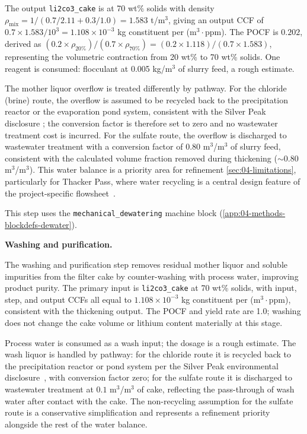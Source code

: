 The output \texttt{li2co3\_cake} is at 70 wt\% solids with density $\rho_\text{mix} = 1/(0.7/2.11 + 0.3/1.0) = 1.583$ t/m$^3$, giving an output CCF of $0.7 \times 1.583 / 10^3 = 1.108 \times 10^{-3}$ kg constituent per (m$^3 \cdot$ppm). The POCF is $0.202$, derived as $(0.2 \times \rho_{20\%}) / (0.7 \times \rho_{70\%}) = (0.2 \times 1.118) / (0.7 \times 1.583)$, representing the volumetric contraction from 20 wt\% to 70 wt\% solids. One reagent is consumed: flocculant at 0.005 kg/m$^3$ of slurry feed, a rough estimate.
 
The mother liquor overflow is treated differently by pathway. For the chloride (brine) route, the overflow is assumed to be recycled back to the precipitation reactor or the evaporation pond system, consistent with the Silver Peak  disclosure \cite{srkconsultingSECTechnicalReport2023a}; the conversion factor is therefore set to zero and no wastewater treatment cost is incurred. For the sulfate route, the overflow is discharged to wastewater treatment with a conversion factor of $0.80$ m$^3$/m$^3$ of slurry feed, consistent with the calculated volume fraction removed during thickening ($\sim$0.80 m$^3$/m$^3$). This water balance is a priority area for refinement \ref{sec:04-limitations}, particularly for Thacker Pass, where water recycling is a central design feature of the project-specific flowsheet~\cite{sgscanadaincSK1300Technical2024}.

This step uses the \texttt{mechanical\_dewatering} machine block (\ref{app:04-methods-blockdefs-dewater}).

\medskip
\noindent\textbf{Washing and purification.}\quad

The washing and purification step removes residual mother liquor and soluble impurities from the  filter cake by counter-washing with process water, improving product purity. The primary input is \texttt{li2co3\_cake} at 70 wt\% solids, with input, step, and output CCFs all equal to $1.108 \times 10^{-3}$ kg constituent per (m$^3 \cdot$ppm), consistent with the thickening output. The POCF and yield rate are 1.0; washing does not change the cake volume or lithium content materially at this stage.
 
Process water is consumed as a wash input; the dosage is a rough estimate. The wash liquor is handled by pathway: for the chloride route it is recycled back to the precipitation reactor or pond system per the Silver Peak environmental disclosure~\cite{srkconsultingSECTechnicalReport2023a}, with conversion factor zero; for the sulfate route it is discharged to wastewater treatment at $0.1$ m$^3$/m$^3$ of cake, reflecting the pass-through of wash water after contact with the cake. The non-recycling assumption for the sulfate route is a conservative simplification and represents a refinement priority alongside the rest of the water balance.

